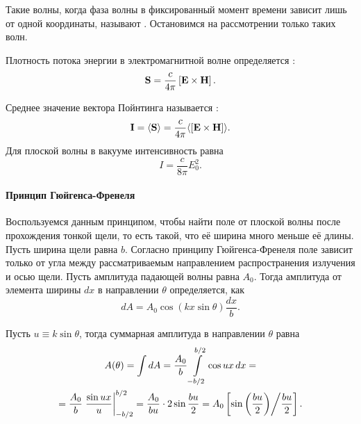 Такие волны, когда фаза волны в фиксированный момент времени зависит лишь от одной координаты, называют . Остановимся на рассмотрении только таких волн.

Плотность потока энергии в электромагнитной волне определяется :
\begin{equation}
	\mathbf{S} = \frac{c}{4\pi} \left[\mathbf{E} \times \mathbf{H}\right].
\end{equation}

Среднее значение вектора Пойнтинга называется :
\begin{equation}
	\mathbf{I} = \langle \mathbf{S}\rangle = \frac{c}{4\pi} \langle \left[\mathbf{E} \times \mathbf{H}\right] \rangle.
\end{equation}
Для плоской волны в вакууме интенсивность равна
\begin{equation}
	I = \frac{c}{8\pi} E_0^2.
\end{equation}

\paragraph{Принцип Гюйгенса-Френеля}

Воспользуемся данным принципом, чтобы найти поле от плоской волны после прохождения тонкой щели, то есть такой, что её ширина много меньше её длины. Пусть ширина щели равна $b$. Согласно принципу Гюйгенса-Френеля поле зависит только от угла между рассматриваемым направлением распространения излучения и осью щели. Пусть амплитуда падающей волны равна $A_0$. Тогда амплитуда от элемента ширины $dx$ в направлении $\theta$ определяется, как
\begin{equation*}
	dA = A_0 \cos (k x \sin \theta) \frac{dx}{b}.
\end{equation*}

Пусть $u \equiv k \sin \theta$, тогда суммарная амплитуда в направлении $\theta$ равна
\begin{multline*}
	A(\theta)
	= \int dA
	= \frac{A_0}{b} \int\limits_{-b/2}^{b/2} \cos ux \,d x =\\
	= \frac{A_0}{b} \left. \frac{\sin ux}{u} \right|_{-b/2}^{b/2}
	= \frac{A_0}{bu} \cdot 2 \sin \frac{bu}{2} = A_0 \left[ \sin \left( \frac{bu}{2}\right) \middle/  \frac{bu}{2} \right] .
\end{multline*}

